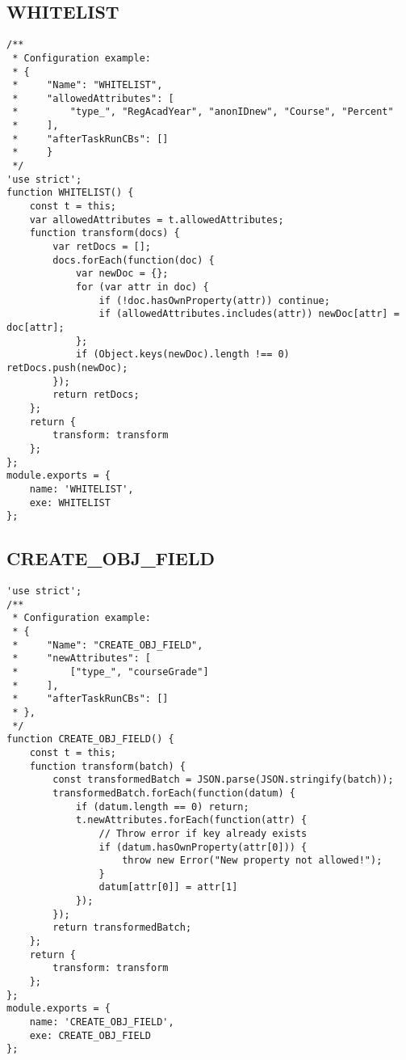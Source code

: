 \subsection{WHITELIST}
\label{netl-trans-whitelist}
\begin{verbatim}
/**
 * Configuration example:
 * {
 *     "Name": "WHITELIST",
 *     "allowedAttributes": [
 *         "type_", "RegAcadYear", "anonIDnew", "Course", "Percent"
 *     ],
 *     "afterTaskRunCBs": []
 *     } 
 */
'use strict';
function WHITELIST() {
    const t = this;
    var allowedAttributes = t.allowedAttributes;
    function transform(docs) {
        var retDocs = [];
        docs.forEach(function(doc) {
            var newDoc = {};
            for (var attr in doc) {
                if (!doc.hasOwnProperty(attr)) continue;
                if (allowedAttributes.includes(attr)) newDoc[attr] = doc[attr];
            };
            if (Object.keys(newDoc).length !== 0) retDocs.push(newDoc);
        });
        return retDocs;
    };
    return {
        transform: transform
    };
};
module.exports = {
    name: 'WHITELIST',
    exe: WHITELIST
};
\end{verbatim}

\subsection{CREATE\_OBJ\_FIELD}
\label{netl-trans-create-obj-field}
\begin{verbatim}
'use strict';
/**
 * Configuration example:
 * {
 *     "Name": "CREATE_OBJ_FIELD",
 *     "newAttributes": [
 *         ["type_", "courseGrade"]
 *     ],
 *     "afterTaskRunCBs": []
 * },
 */
function CREATE_OBJ_FIELD() {
    const t = this;
    function transform(batch) {
        const transformedBatch = JSON.parse(JSON.stringify(batch));
        transformedBatch.forEach(function(datum) {
            if (datum.length == 0) return;
            t.newAttributes.forEach(function(attr) {
                // Throw error if key already exists
                if (datum.hasOwnProperty(attr[0])) {
                    throw new Error("New property not allowed!");
                }
                datum[attr[0]] = attr[1]
            });
        });
        return transformedBatch;
    };
    return {
        transform: transform
    };
};
module.exports = {
    name: 'CREATE_OBJ_FIELD',
    exe: CREATE_OBJ_FIELD
};
\end{verbatim}